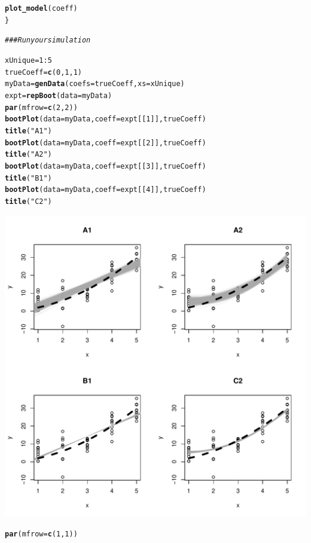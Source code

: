 \documentclass[11pt]{article}\usepackage[]{graphicx}\usepackage[]{color}
\makeatletter
\def\maxwidth{ %
  \ifdim\Gin@nat@width>\linewidth
    \linewidth
  \else
    \Gin@nat@width
  \fi
}
\newcommand{\hlnum}[1]{\textcolor[rgb]{0.686,0.059,0.569}{#1}}%
\newcommand{\hlstr}[1]{\textcolor[rgb]{0.192,0.494,0.8}{#1}}%
\newcommand{\hlcom}[1]{\textcolor[rgb]{0.678,0.584,0.686}{\textit{#1}}}%
\newcommand{\hlopt}[1]{\textcolor[rgb]{0,0,0}{#1}}%
\newcommand{\hlstd}[1]{\textcolor[rgb]{0.345,0.345,0.345}{#1}}%
\newcommand{\hlkwb}[1]{\textcolor[rgb]{0.69,0.353,0.396}{#1}}%
\newcommand{\hlkwc}[1]{\textcolor[rgb]{0.333,0.667,0.333}{#1}}%
\newcommand{\hlkwd}[1]{\textcolor[rgb]{0.737,0.353,0.396}{\textbf{#1}}}%
\newenvironment{kframe}{%
 \def\at@end@of@kframe{}%
 \ifinner\ifhmode%
  \def\at@end@of@kframe{\end{minipage}}%
  \begin{minipage}{\columnwidth}%
 \fi\fi%
 \def\FrameCommand##1{\hskip\@totalleftmargin \hskip-\fboxsep
 \colorbox{shadecolor}{##1}\hskip-\fboxsep
     \hskip-\linewidth \hskip-\@totalleftmargin \hskip\columnwidth}%
 \MakeFramed {\advance\hsize-\width
   \@totalleftmargin\z@ \linewidth\hsize
   \@setminipage}}%
 {\par\unskip\endMakeFramed%
 \at@end@of@kframe}
\newenvironment{knitrout}{}{} %
\makeatother
\begin{document}
\begin{knitrout}
\begin{kframe}
\begin{alltt}
  \hlkwd{plot_model}\hlstd{(coeff)}
\hlstd{\}}

\hlcom{### Run your simulation}

\hlstd{xUnique} \hlkwb{=} \hlnum{1}\hlopt{:}\hlnum{5}
\hlstd{trueCoeff} \hlkwb{=} \hlkwd{c}\hlstd{(}\hlnum{0}\hlstd{,} \hlnum{1}\hlstd{,} \hlnum{1}\hlstd{)}
\hlstd{myData} \hlkwb{=} \hlkwd{genData}\hlstd{(}\hlkwc{coefs} \hlstd{= trueCoeff,} \hlkwc{xs} \hlstd{= xUnique)}
\hlstd{expt} \hlkwb{=} \hlkwd{repBoot}\hlstd{(}\hlkwc{data} \hlstd{= myData )}
\hlkwd{par}\hlstd{(}\hlkwc{mfrow} \hlstd{=} \hlkwd{c}\hlstd{(}\hlnum{2}\hlstd{,} \hlnum{2}\hlstd{))}
\hlkwd{bootPlot}\hlstd{(}\hlkwc{data} \hlstd{= myData,} \hlkwc{coeff} \hlstd{= expt[[}\hlnum{1}\hlstd{]], trueCoeff)}
\hlkwd{title}\hlstd{(}\hlstr{"A1"}\hlstd{)}
\hlkwd{bootPlot}\hlstd{(}\hlkwc{data} \hlstd{= myData,} \hlkwc{coeff} \hlstd{= expt[[}\hlnum{2}\hlstd{]], trueCoeff)}
\hlkwd{title}\hlstd{(}\hlstr{"A2"}\hlstd{)}
\hlkwd{bootPlot}\hlstd{(}\hlkwc{data} \hlstd{= myData,} \hlkwc{coeff} \hlstd{= expt[[}\hlnum{3}\hlstd{]], trueCoeff)}
\hlkwd{title}\hlstd{(}\hlstr{"B1"}\hlstd{)}
\hlkwd{bootPlot}\hlstd{(}\hlkwc{data} \hlstd{= myData,} \hlkwc{coeff} \hlstd{= expt[[}\hlnum{4}\hlstd{]], trueCoeff)}
\hlkwd{title}\hlstd{(}\hlstr{"C2"}\hlstd{)}
\end{alltt}
\end{kframe}
\includegraphics[width=\maxwidth]{figure/unnamed-chunk-6-1} 
\begin{kframe}\begin{alltt}
\hlkwd{par}\hlstd{(}\hlkwc{mfrow} \hlstd{=} \hlkwd{c}\hlstd{(}\hlnum{1}\hlstd{,} \hlnum{1}\hlstd{))}
\end{alltt}
\end{kframe}
\end{knitrout}
\end{document}
